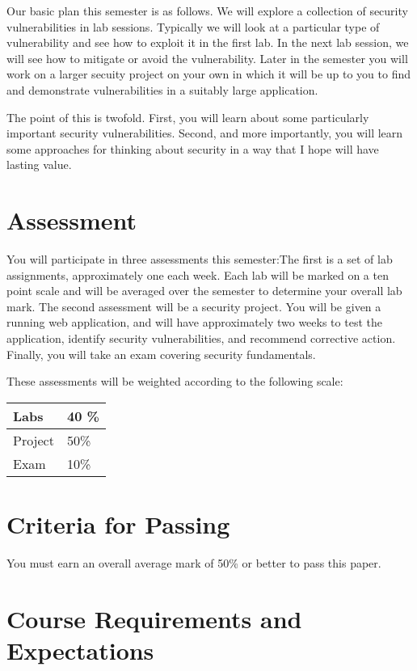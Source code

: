\documentclass{article}
\begin{document}
Our basic plan this semester is as follows. We will explore a collection of security vulnerabilities in lab sessions.  Typically we will look at a particular type of vulnerability and see how to exploit it in the first lab. In the next lab session, we will see how to mitigate or avoid the vulnerability.  Later in the semester you will work on a larger secuity project on your own in which it will be up to you to find and demonstrate vulnerabilities in a suitably large application.

The point of this is twofold. First, you will learn about some particularly important security vulnerabilities. Second, and more importantly, you will learn some approaches for thinking about security in a way that I hope will have lasting value.



\section*{Assessment}
You will participate in three assessments this semester:The first is a set of lab assignments, approximately one each week.  Each lab will be 
marked on a ten point scale and will be averaged over the semester to determine your overall lab mark.  The second assessment will be a security project. You will be given a running web application, and will have approximately two weeks to test the application, identify security vulnerabilities, and recommend corrective action. Finally, you will take an exam covering security fundamentals.

These assessments will be weighted according to the following scale:

\vspace{3mm}
\begin{tabular}{|l|l|}
	\hline
	Labs & 40 \% \\ \hline
	Project & 50\% \\ \hline
	Exam & 10\% \\ \hline
\end{tabular}



  
\section*{Criteria for Passing}
You must earn an overall average mark of 50\% or better to pass this paper.

\section*{Course Requirements and Expectations}
\end{document}
